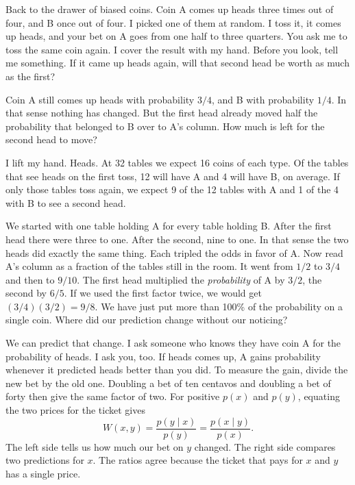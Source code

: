 Back to the drawer of biased coins. Coin A comes up heads three times out of four, and B once out of four. I picked one of them at random. I toss it, it comes up heads, and your bet on A goes from one half to three quarters. You ask me to toss the same coin again. I cover the result with my hand. Before you look, tell me something. If it came up heads again, will that second head be worth as much as the first?

Coin A still comes up heads with probability $3/4$, and B with probability $1/4$. In that sense nothing has changed. But the first head already moved half the probability that belonged to B over to A's column. How much is left for the second head to move?

I lift my hand. Heads. At 32 tables we expect 16 coins of each type. Of the tables that see heads on the first toss, 12 will have A and 4 will have B, on average. If only those tables toss again, we expect 9 of the 12 tables with A and 1 of the 4 with B to see a second head.

\mesas

We started with one table holding A for every table holding B. After the first head there were three to one. After the second, nine to one. In that sense the two heads did exactly the same thing. Each tripled the odds in favor of A. Now read A's column as a fraction of the tables still in the room. It went from $1/2$ to $3/4$ and then to $9/10$. The first head multiplied the \emph{probability} of A by $3/2$, the second by $6/5$. If we used the first factor twice, we would get $(3/4)(3/2)=9/8$. We have just put more than 100\% of the probability on a single coin. Where did our prediction change without our noticing?

We can predict that change. I ask someone who knows they have coin A for the probability of heads. I ask you, too. If heads comes up, A gains probability whenever it predicted heads better than you did. To measure the gain, divide the new bet by the old one. Doubling a bet of ten centavos and doubling a bet of forty then give the same factor of two. For positive $p(x)$ and $p(y)$, equating the two prices for the ticket gives
\[
 W(x,y)=\frac{p(y\mid x)}{p(y)}
       =\frac{p(x\mid y)}{p(x)}.
\]
The left side tells us how much our bet on $y$ changed. The right side compares two predictions for $x$. The ratios agree because the ticket that pays for $x$ and $y$ has a single price.

